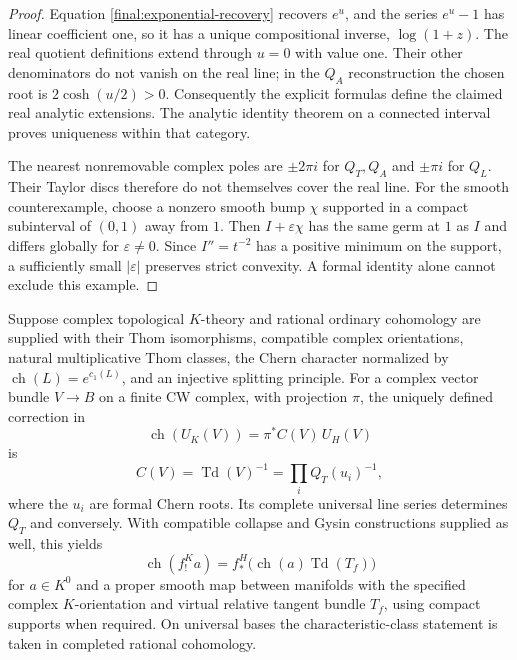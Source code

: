 \begin{proof}
Equation \eqref{final:exponential-recovery} recovers $e^u$, and the
series $e^u-1$ has linear coefficient one, so it has a unique
compositional inverse, $\log(1+z)$.  The real quotient definitions
extend through $u=0$ with value one.  Their other denominators do not
vanish on the real line; in the $Q_A$ reconstruction the chosen root
is $2\cosh(u/2)>0$.  Consequently the explicit formulas define the
claimed real analytic extensions.  The analytic identity theorem on
a connected interval proves uniqueness within that category.

The nearest nonremovable complex poles are $\pm2\pi i$ for $Q_T,Q_A$
and $\pm\pi i$ for $Q_L$.  Their Taylor discs therefore do not themselves
cover the real line.  For the smooth counterexample, choose a nonzero
smooth bump $\chi$ supported in a compact subinterval of $(0,1)$ away
from $1$.  Then $I+\varepsilon\chi$ has the same germ at $1$ as $I$
and differs globally for $\varepsilon\ne0$.  Since $I''=t^{-2}$ has a
positive minimum on the support, a sufficiently small
$|\varepsilon|$ preserves strict convexity.  A formal identity alone
cannot exclude this example.
\end{proof}

\begin{theorem}
\label{final:F4}
Suppose complex topological $K$-theory and rational ordinary cohomology
are supplied with their Thom isomorphisms, compatible complex
orientations, natural multiplicative Thom classes, the Chern character
normalized by $\operatorname{ch}(L)=e^{c_1(L)}$, and an injective
splitting principle.  For a complex vector bundle $V\to B$ on a finite
CW complex, with projection $\pi$, the uniquely defined correction in
\begin{equation}\label{final:Thom-comparison}
 \operatorname{ch}(U_K(V))=\pi^*C(V)\,U_H(V)
\end{equation}
is
\[
 C(V)=\operatorname{Td}(V)^{-1}
      =\prod_i Q_T(u_i)^{-1},
\]
where the $u_i$ are formal Chern roots.  Its complete universal line
series determines $Q_T$ and conversely.  With compatible collapse and
Gysin constructions supplied as well, this yields
\begin{equation}\label{final:RR}
 \operatorname{ch}(f_!^K a)
   =f_*^H\bigl(\operatorname{ch}(a)\operatorname{Td}(T_f)\bigr)
\end{equation}
for $a\in K^0$ and a proper smooth map between manifolds with the
specified complex $K$-orientation and virtual relative tangent bundle
$T_f$, using compact supports when required.  On universal bases
the characteristic-class statement is taken in completed rational
cohomology.
\end{theorem}


